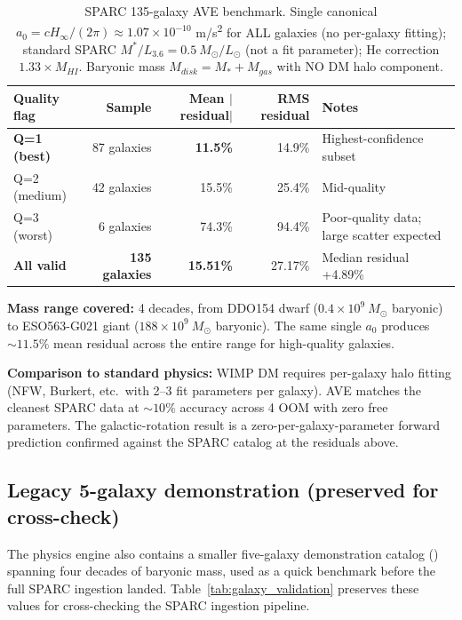 \begin{table}[H]
\centering\footnotesize
\caption{SPARC 135-galaxy AVE benchmark. Single canonical $a_0 = c H_\infty/(2\pi) \approx 1.07 \times 10^{-10}$ m/s\textsuperscript{2} for ALL galaxies (no per-galaxy fitting); standard SPARC $M^*/L_{3.6} = 0.5\ M_\odot/L_\odot$ (not a fit parameter); He correction $1.33 \times M_{HI}$. Baryonic mass $M_{disk} = M_* + M_{gas}$ with NO DM halo component.}
\label{tab:sparc_benchmark}
\begin{tabularx}{\textwidth}{@{}lrrrX@{}}
\toprule
\textbf{Quality flag} & \textbf{Sample} & \textbf{Mean $|$residual$|$} & \textbf{RMS residual} & Notes \\
\midrule
\textbf{Q=1 (best)} & 87 galaxies & \textbf{11.5\%} & 14.9\% & Highest-confidence subset \\
Q=2 (medium) & 42 galaxies & 15.5\% & 25.4\% & Mid-quality \\
Q=3 (worst) & 6 galaxies & 74.3\% & 94.4\% & Poor-quality data; large scatter expected \\
\textbf{All valid} & \textbf{135 galaxies} & \textbf{15.51\%} & 27.17\% & Median residual +4.89\% \\
\bottomrule
\end{tabularx}
\end{table}

\noindent\textbf{Mass range covered:} 4 decades, from DDO154 dwarf ($0.4 \times 10^9\ M_\odot$ baryonic) to ESO563-G021 giant ($188 \times 10^9\ M_\odot$ baryonic). The same single $a_0$ produces $\sim 11.5\%$ mean residual across the entire range for high-quality galaxies.

\noindent\textbf{Comparison to standard physics:} WIMP DM requires per-galaxy halo fitting (NFW, Burkert, etc.\ with 2--3 fit parameters per galaxy). AVE matches the cleanest SPARC data at $\sim 10\%$ accuracy across 4 OOM with zero free parameters. The galactic-rotation result is a zero-per-galaxy-parameter forward prediction confirmed against the SPARC catalog at the residuals above.

\subsection{Legacy 5-galaxy demonstration (preserved for cross-check)}

The physics engine also contains a smaller five-galaxy demonstration catalog () spanning four decades of baryonic mass, used as a quick benchmark before the full SPARC ingestion landed.  Table~\ref{tab:galaxy_validation} preserves these values for cross-checking the SPARC ingestion pipeline.

